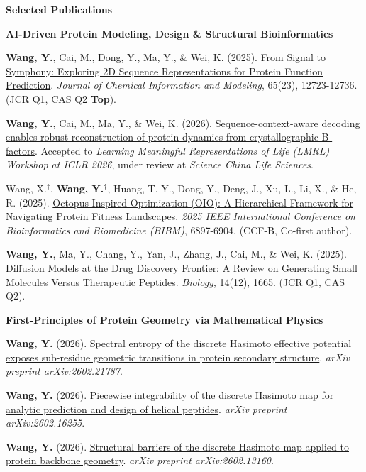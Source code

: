 \documentclass[10pt]{article}
\begin{document}
	\vspace{2pt}
	\begin{center}
		\textbf{\large Selected Publications}
	\end{center}
	\vspace{-4pt}
	\textbf{AI-Driven Protein Modeling, Design \& Structural Bioinformatics}
	\begin{enumerate}[noitemsep, topsep=2pt, partopsep=0pt, parsep=0pt, leftmargin=*, label={[\arabic*]}]
		\item \textbf{Wang, Y.}, Cai, M., Dong, Y., Ma, Y., \& Wei, K. (2025). \href{https://pubs.acs.org/doi/abs/10.1021/acs.jcim.5c01768}{From Signal to Symphony: Exploring 2D Sequence Representations for Protein Function Prediction}. \textit{Journal of Chemical Information and Modeling}, 65(23), 12723-12736. (JCR Q1, CAS Q2 \textbf{Top}).
		\item \textbf{Wang, Y.}, Cai, M., Ma, Y., \& Wei, K. (2026). \href{https://openreview.net/forum?id=rTO3JOgC3a}{Sequence-context-aware decoding enables robust reconstruction of protein dynamics from crystallographic B-factors}. Accepted to \textit{Learning Meaningful Representations of Life (LMRL) Workshop at ICLR 2026}, under review at \textit{Science China Life Sciences}.
		\item Wang, X.$^\dagger$, \textbf{Wang, Y.}$^\dagger$, Huang, T.-Y., Dong, Y., Deng, J., Xu, L., Li, X., \& He, R. (2025). \href{https://ieeexplore.ieee.org/abstract/document/11356718/}{Octopus Inspired Optimization (OIO): A Hierarchical Framework for Navigating Protein Fitness Landscapes}. \textit{2025 IEEE International Conference on Bioinformatics and Biomedicine (BIBM)}, 6897-6904. (CCF-B, Co-first author).
		\item \textbf{Wang, Y.}, Ma, Y., Chang, Y., Yan, J., Zhang, J., Cai, M., \& Wei, K. (2025). \href{https://www.mdpi.com/2079-7737/14/12/1665}{Diffusion Models at the Drug Discovery Frontier: A Review on Generating Small Molecules Versus Therapeutic Peptides}. \textit{Biology}, 14(12), 1665. (JCR Q1, CAS Q2).
	\end{enumerate}
	
	\vspace{2pt}
	\textbf{First-Principles of Protein Geometry via Mathematical Physics}
	\begin{enumerate}[noitemsep, topsep=2pt, partopsep=0pt, parsep=0pt, leftmargin=*, label={[\arabic*]}, resume]
		\item \textbf{Wang, Y.} (2026). \href{https://arxiv.org/abs/2602.21787}{Spectral entropy of the discrete Hasimoto effective potential exposes sub-residue geometric transitions in protein secondary structure}. \textit{arXiv preprint arXiv:2602.21787}.
		\item \textbf{Wang, Y.} (2026). \href{https://arxiv.org/abs/2602.16255}{Piecewise integrability of the discrete Hasimoto map for analytic prediction and design of helical peptides}. \textit{arXiv preprint arXiv:2602.16255}.
		\item \textbf{Wang, Y.} (2026). \href{https://arxiv.org/abs/2602.13160}{Structural barriers of the discrete Hasimoto map applied to protein backbone geometry}. \textit{arXiv preprint arXiv:2602.13160}.
	\end{enumerate}
	
\end{document}
